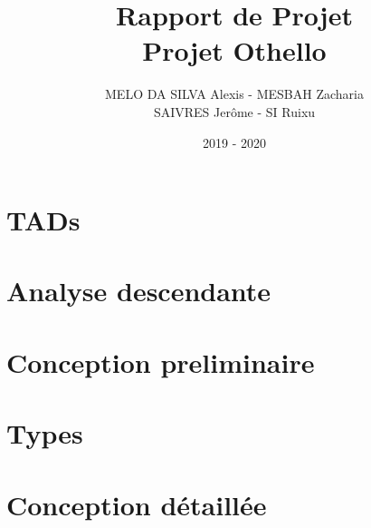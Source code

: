 \documentclass[french]{extarticle}
\begin{document}
\title{Rapport de Projet\\
	Projet Othello}
\author{MELO DA SILVA Alexis - MESBAH Zacharia\\
SAIVRES Jerôme - SI Ruixu}
\date{2019 - 2020}
\maketitle
\newpage
\tableofcontents
\newpage
\section{TADs}

\newpage
\section{Analyse descendante}

\newpage
\section{Conception preliminaire}



\newpage
\section{Types}

\newpage
\section{Conception détaillée}









\end{document}

